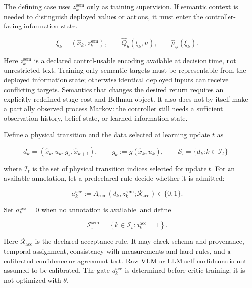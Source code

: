 \documentclass[a4paper]{article}
\begin{document}
The defining case uses $z_k^{\mathrm{sem}}$ only as training supervision. If
semantic context is needed to distinguish deployed values or actions, it must
enter the controller-facing information state:

\begin{equation}
\xi_k=(\widehat x_k,z_k^{\mathrm{sem}}),\qquad
\widehat Q_\theta(\xi_k,u),\qquad
\widehat\mu_\phi(\xi_k).
\end{equation}

Here $z_k^{\mathrm{sem}}$ is a declared control-usable encoding available at
decision time, not unrestricted text. Training-only semantic targets must be
representable from the deployed information state; otherwise identical
deployed inputs can receive conflicting targets. Semantics that changes the
desired return requires an explicitly redefined stage cost and Bellman
object. It also does not by itself make a partially observed process Markov:
the controller still needs a sufficient observation history, belief state, or
learned information state.

Define a physical transition and the data selected at learning update $t$ as

\begin{equation}
d_k
=
(\widehat x_k,u_k,g_k,\widehat x_{k+1}),
\qquad
g_k
:=
g(\widehat x_k,u_k),
\qquad
\mathcal S_t
=
\{d_k:k\in\mathcal I_t\},
\end{equation}

where $\mathcal I_t$ is the set of physical transition indices selected for
update $t$. For an available annotation, let a predeclared rule decide whether
it is admitted:

\begin{equation}
a_k^{\mathrm{acc}}
:=
A_{\mathrm{sem}}
\!\left(
d_k,z_k^{\mathrm{sem}};\mathcal R_{\mathrm{acc}}
\right)
\in\{0,1\}.
\end{equation}

Set $a_k^{\mathrm{acc}}=0$ when no annotation is available, and define

\begin{equation}
\mathcal I_t^{\mathrm{sem}}
=
\left\{
k\in\mathcal I_t:
a_k^{\mathrm{acc}}=1
\right\}.
\end{equation}

Here $\mathcal R_{\mathrm{acc}}$ is the declared acceptance rule. It may check
schema and provenance, temporal assignment, consistency with measurements and
hard rules, and a calibrated confidence or agreement test. Raw VLM or LLM
self-confidence is not assumed to be calibrated. The gate
$a_k^{\mathrm{acc}}$ is determined before critic training; it is not optimized
with $\theta$.
\end{document}
